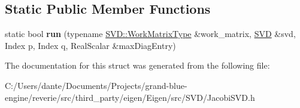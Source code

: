 \subsection*{Static Public Member Functions}
\begin{DoxyCompactItemize}
\item 
\mbox{\label{struct_eigen_1_1internal_1_1svd__precondition__2x2__block__to__be__real_3_01_matrix_type_00_01_qb58fa819a3391e7d55d98ccdc14db9e4_a76a3369c7786e295de41c7061b9da031}} 
static bool {\bfseries run} (typename \mbox{\hyperlink{class_eigen_1_1_matrix}{S\+V\+D\+::\+Work\+Matrix\+Type}} \&work\+\_\+matrix, \mbox{\hyperlink{class_eigen_1_1_jacobi_s_v_d}{S\+VD}} \&svd, Index p, Index q, Real\+Scalar \&max\+Diag\+Entry)
\end{DoxyCompactItemize}


The documentation for this struct was generated from the following file\+:\begin{DoxyCompactItemize}
\item 
C\+:/\+Users/dante/\+Documents/\+Projects/grand-\/blue-\/engine/reverie/src/third\+\_\+party/eigen/\+Eigen/src/\+S\+V\+D/Jacobi\+S\+V\+D.\+h\end{DoxyCompactItemize}

